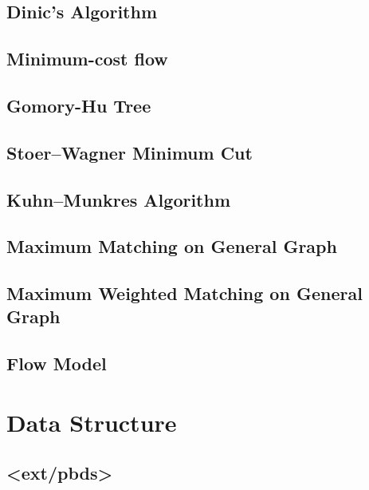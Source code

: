 \documentclass[a4paper,10pt,twocolumn,oneside]{article}
\begin{document}
\subsection{Dinic's Algorithm}

% 
\subsection{Minimum-cost flow}

\subsection{Gomory-Hu Tree}

\subsection{Stoer–Wagner Minimum Cut}

\subsection{Kuhn–Munkres Algorithm}

\subsection{Maximum Matching on General Graph}

\subsection{Maximum Weighted Matching on General Graph}

\subsection{Flow Model}

\section{Data Structure}
% 
\subsection{<ext/pbds>}

\end{document}
